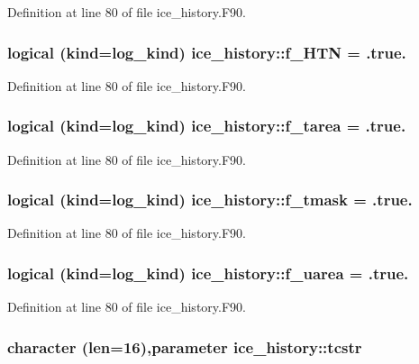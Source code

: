Definition at line 80 of file ice\_\-history.F90.\hypertarget{namespaceice__history_a7e63313bc71fed15ff1d16cbaf4d74ea}{
\subsubsection[{f\_\-HTN}]{\setlength{\rightskip}{0pt plus 5cm}logical (kind=log\_\-kind) {\bf ice\_\-history::f\_\-HTN} = .true.}}
\label{namespaceice__history_a7e63313bc71fed15ff1d16cbaf4d74ea}


Definition at line 80 of file ice\_\-history.F90.\hypertarget{namespaceice__history_a7b8cc0a9e56bbe22f0015aa2062953d0}{
\subsubsection[{f\_\-tarea}]{\setlength{\rightskip}{0pt plus 5cm}logical (kind=log\_\-kind) {\bf ice\_\-history::f\_\-tarea} = .true.}}
\label{namespaceice__history_a7b8cc0a9e56bbe22f0015aa2062953d0}


Definition at line 80 of file ice\_\-history.F90.\hypertarget{namespaceice__history_ac6635a8bcde54a554d4b60c7c6566b26}{
\subsubsection[{f\_\-tmask}]{\setlength{\rightskip}{0pt plus 5cm}logical (kind=log\_\-kind) {\bf ice\_\-history::f\_\-tmask} = .true.}}
\label{namespaceice__history_ac6635a8bcde54a554d4b60c7c6566b26}


Definition at line 80 of file ice\_\-history.F90.\hypertarget{namespaceice__history_ac39fd46be06edb447fb96f16103e4d96}{
\subsubsection[{f\_\-uarea}]{\setlength{\rightskip}{0pt plus 5cm}logical (kind=log\_\-kind) {\bf ice\_\-history::f\_\-uarea} = .true.}}
\label{namespaceice__history_ac39fd46be06edb447fb96f16103e4d96}


Definition at line 80 of file ice\_\-history.F90.\hypertarget{namespaceice__history_a56409d6f67844894d11f17ca553864bf}{
\subsubsection[{tcstr}]{\setlength{\rightskip}{0pt plus 5cm}character (len=16),parameter {\bf ice\_\-history::tcstr}}}
\label{namespaceice__history_a56409d6f67844894d11f17ca553864bf}


